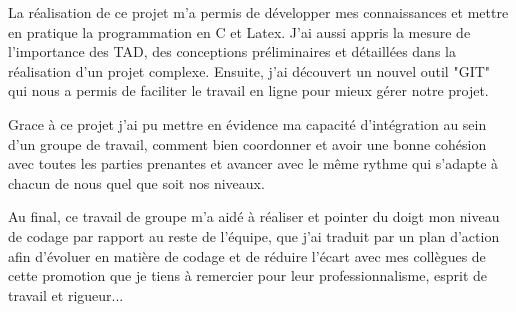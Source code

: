 La réalisation de ce projet m'a permis de développer mes connaissances et mettre en pratique la programmation en C et Latex. J'ai aussi appris la mesure de l'importance des TAD, des conceptions préliminaires et détaillées dans la réalisation d'un projet complexe. Ensuite, j'ai découvert un nouvel outil "GIT" qui nous a permis de faciliter le travail en ligne pour mieux gérer notre projet.

Grace à ce projet j'ai pu mettre en évidence ma capacité d'intégration au sein d'un groupe de travail, comment bien coordonner et avoir une bonne cohésion avec toutes les parties prenantes et avancer avec le même rythme qui s'adapte à chacun de nous quel que soit nos niveaux.

Au final, ce travail de groupe m'a aidé à réaliser et pointer du doigt mon niveau de codage par rapport au reste de l'équipe, que j'ai traduit par un plan d'action afin d'évoluer en matière de codage et de réduire l'écart avec mes collègues de cette promotion que je tiens à remercier pour leur professionnalisme, esprit de travail et rigueur...